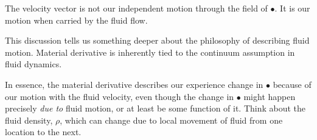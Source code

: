 The velocity vector is not our independent motion through the field of $\bullet$. It is our motion when carried by the fluid flow.


This discussion tells us something deeper about the philosophy of describing fluid motion. Material derivative is inherently tied to the continuum assumption in fluid dynamics.

In essence, the material derivative describes our experience change in $\bullet$ because of our motion with the fluid velocity, even though the change in $\bullet$ might happen precisely \textit{due to} fluid motion, or at least be some function of it. Think about the fluid density, $\rho$, which can change due to local movement of fluid from one location to the next.



